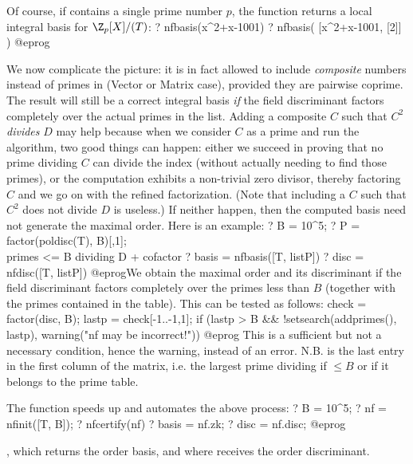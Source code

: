 Of course, if  contains a single prime number $p$,
the function returns a local integral basis for $\Z_p[X]/(T)$:
\bprog
? nfbasis(x^2+x-1001)
? nfbasis( [x^2+x-1001, [2]] )
@eprog


We now complicate the picture: it is in fact allowed to include
\emph{composite} numbers instead of primes
in  (Vector or Matrix case), provided they are pairwise coprime.
The result will still be a correct integral basis \emph{if}
the field discriminant factors completely over the actual primes in the list.
Adding a composite $C$ such that $C^2$ \emph{divides} $D$ may help because
when we consider $C$ as a prime and run the algorithm, two good things can
happen: either we
succeed in proving that no prime dividing $C$ can divide the index
(without actually needing to find those primes), or the computation
exhibits a non-trivial zero divisor, thereby factoring $C$ and
we go on with the refined factorization. (Note that including a $C$
such that $C^2$ does not divide $D$ is useless.) If neither happen, then the
computed basis need not generate the maximal order. Here is an example:
\bprog
? B = 10^5;
? P = factor(poldisc(T), B)[,1]; \\ primes <= B dividing D + cofactor
? basis = nfbasis([T, listP])
? disc = nfdisc([T, listP])
@eprog\noindent We obtain the maximal order and its discriminant if the
field discriminant factors
completely over the primes less than $B$ (together with the primes
contained in the  table). This can be tested as follows:
\bprog
  check = factor(disc, B);
  lastp = check[-1..-1,1];
  if (lastp > B && !setsearch(addprimes(), lastp),
    warning("nf may be incorrect!"))
@eprog\noindent
This is a sufficient but not a necessary condition, hence the warning,
instead of an error. N.B.  is the last entry
in the first column of the  matrix, i.e. the largest prime
dividing  if $\leq B$ or if it belongs to the prime table.

The function  speeds up and automates the above process:
\bprog
? B = 10^5;
? nf = nfinit([T, B]);
? nfcertify(nf)
? basis = nf.zk;
? disc = nf.disc;
@eprog

, which returns the order
basis, and where  receives the order discriminant.

